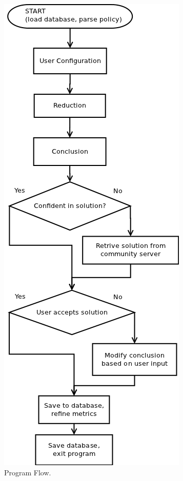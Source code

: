 \begin{figure}[htbp]
\begin{center}
\includegraphics[width = \textwidth]{DesignReport/uml/flowchart.png}
\caption{Program Flow.}
\label{DesignFlowChart}
\end{center}
\end{figure}


